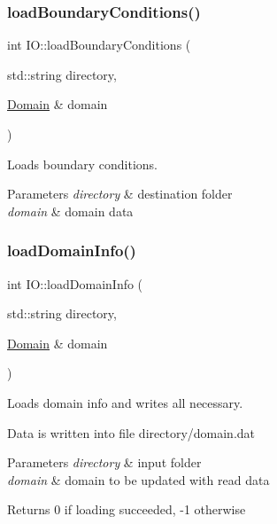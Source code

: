 \subsubsection{\texorpdfstring{load\+Boundary\+Conditions()}{loadBoundaryConditions()}}
{\footnotesize\ttfamily int I\+O\+::load\+Boundary\+Conditions (\begin{DoxyParamCaption}\item[{std\+::string}]{directory,  }\item[{\mbox{\hyperlink{classDomain}{Domain}} \&}]{domain }\end{DoxyParamCaption})}



Loads boundary conditions. 


\begin{DoxyParams}{Parameters}
{\em directory} & destination folder \\
\hline
{\em domain} & domain data \\
\hline
\end{DoxyParams}
\mbox{\label{namespaceIO_ab1b5447a50be31c6e04b64a13c58a05d}} 
\subsubsection{\texorpdfstring{load\+Domain\+Info()}{loadDomainInfo()}}
{\footnotesize\ttfamily int I\+O\+::load\+Domain\+Info (\begin{DoxyParamCaption}\item[{std\+::string}]{directory,  }\item[{\mbox{\hyperlink{classDomain}{Domain}} \&}]{domain }\end{DoxyParamCaption})}



Loads domain info and writes all necessary. 

Data is written into file directory/domain.\+dat


\begin{DoxyParams}{Parameters}
{\em directory} & input folder \\
\hline
{\em domain} & domain to be updated with read data\\
\hline
\end{DoxyParams}
\begin{DoxyReturn}{Returns}
0 if loading succeeded, -\/1 otherwise 
\end{DoxyReturn}
\mbox{\label{namespaceIO_ae9baa8f2d704798ba4b669718c5630c6}} 
